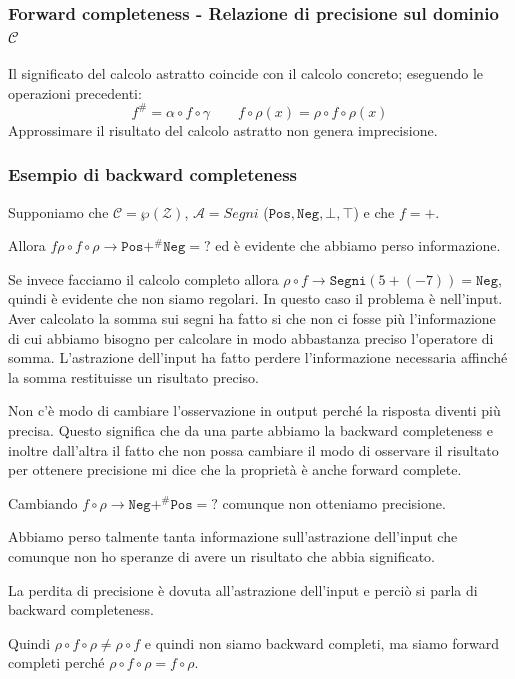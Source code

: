 \subsubsection{Forward completeness - Relazione di precisione sul dominio $\mathcal{C}$}
Il significato del calcolo astratto coincide con il calcolo concreto; eseguendo le operazioni 
precedenti:
\[
    f^\# = \alpha \circ f \circ \gamma \qquad f \circ \rho(x) = \rho \circ f \circ \rho(x)
\]
Approssimare il risultato del calcolo astratto non genera imprecisione.
\subsubsection{Esempio di backward completeness}
Supponiamo che $\mathcal{C} = \wp(\mathcal{Z})$, $\mathcal{A} = Segni$ ($\texttt{Pos}, \texttt{Neg},
\bot, \top$) e che $f=+$.

Allora $f \rho \circ f \circ \rho \to \texttt{Pos} +^\# \texttt{Neg} = ?$ ed è evidente che abbiamo perso informazione.

Se invece facciamo il calcolo completo allora $\rho \circ f \to \texttt{Segni}(5 + (-7)) = \texttt{Neg}$, quindi 
è evidente che non siamo regolari. In questo caso il problema è nell'input. Aver calcolato la somma 
sui segni ha fatto si che non ci fosse più l'informazione di cui abbiamo bisogno per calcolare
in modo abbastanza preciso l'operatore di somma. L'astrazione dell'input ha fatto perdere 
l'informazione necessaria affinché la somma restituisse un risultato preciso.

Non c'è modo di cambiare l'osservazione in output perché la risposta diventi più precisa. 
Questo significa che da una parte abbiamo la backward completeness e inoltre dall'altra il 
fatto che non possa cambiare il modo di osservare il risultato per ottenere precisione mi dice che la 
proprietà è anche forward complete.

Cambiando $f \circ \rho \to \texttt{Neg} +^\# \texttt{Pos} = ?$ comunque non otteniamo
precisione.

Abbiamo perso talmente tanta informazione sull'astrazione dell'input che comunque non 
ho speranze di avere un risultato che abbia significato. 

\begin{tcolorbox}
    La perdita di precisione è dovuta all'astrazione dell'input e perciò si parla di
    backward completeness.
\end{tcolorbox}

\begin{tcolorbox}
    Quindi $\rho \circ f \circ \rho \not= \rho \circ f $ e quindi non siamo backward completi, ma 
    siamo forward completi perché $\rho \circ f \circ \rho = f \circ \rho$.
\end{tcolorbox}
